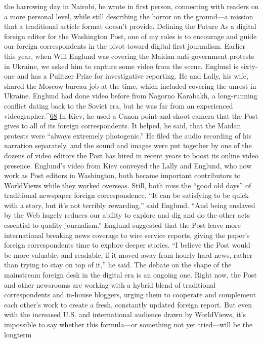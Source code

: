 the harrowing day in Nairobi, he wrote in first person, connecting with readers on a more
personal level, while still describing the horror on the ground—a mission that a
traditional article format doesn’t provide.
Defining the Future
As a digital foreign editor for the Washington Post, one of my roles is to encourage and
guide our foreign correspondents in the pivot toward digital-first journalism. Earlier this
year, when Will Englund was covering the Maidan anti-government protests in Ukraine,
we asked him to capture some video from the scene.
Englund is sixty-one and has a Pulitzer Prize for investigative reporting. He and Lally, his
wife, shared the Moscow bureau job at the time, which included covering the unrest in
Ukraine. Englund had done video before from Nagorno Karabakh, a long-running
conflict dating back to the Soviet era, but he was far from an experienced videographer.^{\href{#endnotes}{68}}
In Kiev, he used a Canon point-and-shoot camera that the Post gives to all of its foreign
correspondents. It helped, he said, that the Maidan protests were ``always extremely
photogenic.'' He filed the audio recording of his narration separately, and the sound and
images were put together by one of the dozens of video editors the Post has hired in
recent years to boost its online video presence. Englund’s video from Kiev conveyed the
Lally and Englund, who now work as Post editors in Washington, both became important
contributors to WorldViews while they worked overseas. Still, both miss the ``good old
days'' of traditional newspaper foreign correspondence. ``It can be satisfying to be quick
with a story, but it’s not terribly rewarding,'' said Englund. ``And being enslaved by the
Web hugely reduces our ability to explore and dig and do the other acts essential to
quality journalism.''
Englund suggested that the Post leave more international breaking news coverage to wire
service reports, giving the paper’s foreign correspondents time to explore deeper stories.
``I believe the Post would be more valuable, and readable, if it moved away from hourly
hard news, rather than trying to stay on top of it,'' he said.
The debate on the shape of the mainstream foreign desk in the digital era is an ongoing
one. Right now, the Post and other newsrooms are working with a hybrid blend of
traditional correspondents and in-house bloggers, urging them to cooperate and
complement each other’s work to create a fresh, constantly updated foreign report. But
even with the increased U.S. and international audience drawn by WorldViews, it’s
impossible to say whether this formula—or something not yet tried—will be the longterm
